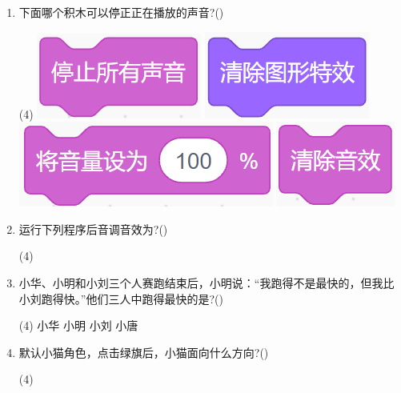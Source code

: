 \documentclass[10pt, a4paper]{article}
\begin{document}
\begin{enumerate}
        \item 下面哪个积木可以停正正在播放的声音?(\qquad)
        \begin{tasks}(4)
            \task \includegraphics[width=.08\textwidth]{7a.png}
            \task \includegraphics[width=.08\textwidth]{7b.png}
            \task \includegraphics[width=.12\textwidth]{7c.png}
            \task \includegraphics[width=.06\textwidth]{7d.png}
        \end{tasks}

        \newpage
        \item 运行下列程序后音调音效为?(\qquad)
        \begin{tasks}(4)
        \end{tasks}

        \item 小华、小明和小刘三个人赛跑结束后，小明说：“我跑得不是最快的，但我比小刘跑得快。”他们三人中跑得最快的是?(\qquad)
        \begin{tasks}(4)
            \task 小华
            \task 小明
            \task 小刘
            \task 小唐
        \end{tasks}

        \item 默认小猫角色，点击绿旗后，小猫面向什么方向?(\qquad)
        \begin{tasks}(4)
        \end{tasks}


\end{enumerate}
\end{document}
